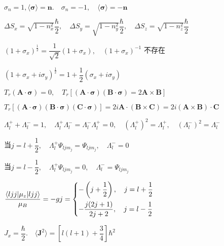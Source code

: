 \answer $ \sigma_{n}=1,\langle\boldsymbol{\sigma}\rangle=\boldsymbol{n}.\quad \sigma_{n}=-1,\quad \langle\boldsymbol{\sigma}\rangle=-\boldsymbol{n} $

		$ \Delta S_{x}=\sqrt{1-n_{x}^{2}}\dfrac{\hbar}{2},\quad \Delta S_{y}=\sqrt{1-n_{y}^{2}}\dfrac{\hbar}{2},\quad \Delta S_{z}=\sqrt{1-n_{z}^{2}}\dfrac{\hbar}{2} $


\answer  $ (1+\sigma_{x})^{\frac{1}{2}}=\dfrac{1}{\sqrt{2}}(1+\sigma_{x}),\quad (1+\sigma_{x})^{-1} $ 不存在 

		$ (1+\sigma_{x}+i\sigma_{y})^{\frac{1}{2}}=1+\dfrac{1}{2}(\sigma_{x}+i\sigma_{y}) $

	

\answer $ T_{r}(\boldsymbol{A}\cdot\boldsymbol{\sigma})=0,\quad T_{r}[(\boldsymbol{A}\cdot\boldsymbol{\sigma})(\boldsymbol{B}\cdot\boldsymbol{\sigma})=2\boldsymbol{A}\times\boldsymbol{B}] $

		$ T_{r}[(\boldsymbol{A}\cdot\boldsymbol{\sigma})(\boldsymbol{B}\cdot\boldsymbol{\sigma})(\boldsymbol{C}\cdot\boldsymbol{\sigma})]=2i\boldsymbol{A}\cdot(\boldsymbol{B}\times\boldsymbol{C})=2i(\boldsymbol{A}\times\boldsymbol{B})\cdot\boldsymbol{C} $

				

\answer $ \Lambda_{l}^{+}+\Lambda_{l}^{-}=1,\quad \Lambda_{l}^{+}\Lambda_{l}^{-}=\Lambda_{l}^{-}\Lambda_{l}^{+}=0,\quad (\Lambda_{l}^{+})^{2}=\Lambda_{l}^{+},\quad (\Lambda_{l}^{-})^{2}=\Lambda_{l}^{-} $

		当$ j=l+\dfrac{1}{2},\quad \Lambda_{l}^{+}\varPsi_{ljm_{j}}=\varPsi_{ljm_{j}},\quad \Lambda_{l}^{-}=0 $
		
		当$ j=l-\dfrac{1}{2},\quad \Lambda_{l}^{+}\varPsi_{ljm_{j}}=0,\quad \Lambda_{l}^{-}=\varPsi_{ljm_{j}} $


\answer $ \dfrac{\langle ljj|\mu_{z}|ljj \rangle }{\mu_{B}}=-gj=\begin{dcases}
	-\left(j+\dfrac{1}{2}\right),\quad j=l+\dfrac{1}{2}	\\
	-\dfrac{j(2j+1)}{2j+2},\quad j=l-\dfrac{1}{2}
\end{dcases} $

\answer $ J_{x}=\dfrac{\hbar}{2}.\quad \langle\boldsymbol{J}^{2}\rangle=\left[l(l+1)+\dfrac{3}{4}\right]\hbar^{2} $

